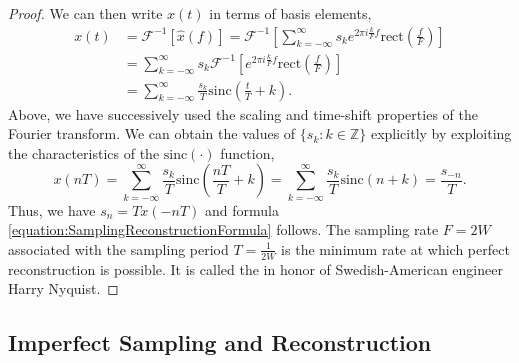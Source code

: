 \begin{proof}
We can then write $x(t)$ in terms of basis elements,
\begin{equation*}
\begin{split}
x(t) &= \mathcal{F}^{-1} \left[ \hat{x}(f) \right]
= \mathcal{F}^{-1} \left[ \sum_{k=-\infty}^{\infty} s_k e^{2 \pi i \frac{k}{F} f}
\mathrm{rect} \left( \frac{f}{F} \right) \right] \\
&= \sum_{k=-\infty}^{\infty} s_k \mathcal{F}^{-1} \left[ e^{2 \pi i \frac{k}{F} f}
\mathrm{rect} \left( \frac{f}{F} \right) \right] \\
&= \sum_{k=-\infty}^{\infty} \frac{s_k}{T} \mathrm{sinc} \left( \frac{t}{T} + k \right) .
\end{split}
\end{equation*}
Above, we have successively used the scaling and time-shift properties of the Fourier transform.
We can obtain the values of $\{ s_k : k \in \mathbb{Z} \}$ explicitly by exploiting the characteristics of the $\mathrm{sinc} (\cdot)$ function,
\begin{equation*}
x(nT)
= \sum_{k=-\infty}^{\infty}
\frac{s_k}{T} \mathrm{sinc} \left( \frac{nT}{T} + k \right)
= \sum_{k=-\infty}^{\infty}
\frac{s_k}{T} \mathrm{sinc} ( n + k ) = \frac{s_{-n}}{T} .
\end{equation*}
Thus, we have $s_{n} = T x(-nT)$ and formula \eqref{equation:SamplingReconstructionFormula} follows.
The sampling rate $F = 2W$ associated with the sampling period $T = \frac{1}{2W}$ is the minimum rate at which perfect reconstruction is possible.
It is called the  in honor of Swedish-American engineer Harry Nyquist.
\end{proof}


\newpage
\subsection{Imperfect Sampling and Reconstruction}

